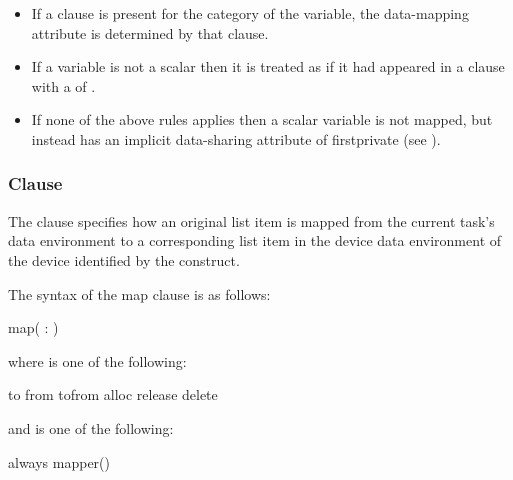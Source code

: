 \begin{itemize}
  \item If a  clause is present for the category of the
    variable, the data-mapping attribute is determined by that clause.

\item If a variable is not a scalar then it is treated as if it had appeared 
in a  clause with a  of .


\item If none of the above rules applies then a scalar variable is not
mapped, but instead has an implicit data-sharing attribute of
firstprivate (see ).
\end{itemize}

\subsubsection{ Clause}
\label{subsec:map Clause}
\summary
The  clause specifies how an original list item is mapped from the current task's data environment to a corresponding list item in the device data environment of the device identified by the construct.

\syntax
The syntax of the map clause is as follows:

\begin{ompSyntax}
map(\plc{[ [map-type-modifier[,]] map-type} : \plc{] list})
\end{ompSyntax}

where  is one of the following:

\begin{indentedcodelist}
to
from
tofrom
alloc
release
delete
\end{indentedcodelist}

and  is one of the following:

\begin{indentedcodelist}
always
mapper()
\end{indentedcodelist}

